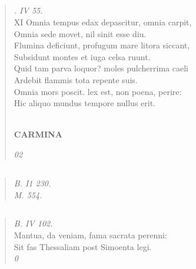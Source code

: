 \documentclass[11pt, a4paper]{report}
\begin{document}
            \subsection*{}
      \begin{verse}
      \textit{. IV 55.} \\ XI Omnia tempus edax depascitur, omnia carpit, \\ Omnia sede movet, nil sinit esse diu. \\ Flumina deficiunt, profugum mare litora siccant, \\ Subsidunt montes et iuga celsa ruunt. \\ Quid tam parva loquor? moles pulcherrima caeli \\ Ardebit flammis tota repente suis. \\ Omnia mors poscit. lex est, non poena, perire: \\ Hic aliquo mundus tempore nullus erit. \\ 
        ﻿\pagebreak 
     \marginpar{[192]} \begin{center} \textbf{CARMINA} \end{center}\textit{02} \\ 
      \end{verse}
  
            \subsection*{}
      \begin{verse}
      \textit{B. I1 230.} \\ \textit{M. 554.} \\ 
      \end{verse}
  
            \subsection*{}
      \begin{verse}
      \textit{B. IV 102.} \\ Mantua, da veniam, fama sacrata perenni: \\ Sit fas Thessaliam post Simoenta legi. \\ \textit{0} \\ 
      \end{verse}
  
\end{document}
